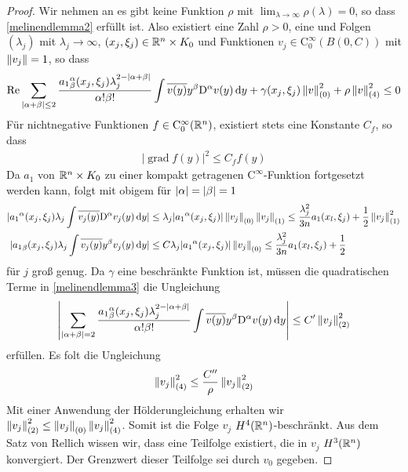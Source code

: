 \begin{proof}
Wir nehmen an es gibt keine Funktion $\rho$ mit $\lim_{\lambda\to\infty}\rho(\lambda)=0$, so dass \eqref{melinendlemma2} erfüllt ist. Also existiert eine Zahl $\rho>0$, eine und Folgen $(\lambda_j)$ mit $\lambda_j\to\infty$, $(x_j,\xi_j)\in\mathbb R^n\times K_0$ und Funktionen $v_j\in\mathrm C^\infty_0(B(0,C))$ mit $\left\lVert v_j\right\rVert =1$, so dass
\begin{align}\label{melinendlemma3}
\operatorname{Re} \sum_{|\alpha+\beta|\le 2} \frac{{a_1}^\alpha_\beta(x_j,\xi_j)\lambda_j^{2-|\alpha+\beta|}}{\alpha!\beta!}\int\overline{v(y)}y^\beta\mathrm D^\alpha v(y)\,\mathrm d y + \gamma(x_j,\xi_j)\left\lVert v\right\rVert_{(0)}^2 + \rho\left\lVert v\right\rVert _{(4)}^2 \le 0
\end{align}
Für nichtnegative Funktionen $f\in\mathrm C^\infty_0 (\mathbb R^n)$,  existiert stets eine Konstante $C_f$, so dass
\begin{align*}
|\operatorname{grad}f(y)|^2\le C_f f(y)
\end{align*}
Da $a_1$ von $\mathbb R^n\times K_0$ zu einer kompakt getragenen $\mathrm C^\infty$-Funktion fortgesetzt werden kann, folgt mit obigem für $\lvert\alpha\rvert=\lvert\beta\rvert=1$
\begin{align*}
|{a_1}^\alpha(x_j,\xi_j)\lambda_j\int \overline{v_j(y)}\mathrm D^\alpha v_j(y)\,\mathrm d y| &\le \lambda_j|{a_1}^\alpha(x_j,\xi_j)|\left\lVert v_j\right\rVert_{(0)}\left\lVert v_j\right\rVert_{(1)} \le \frac{\lambda_j^2}{3n}a_1(x_l,\xi_j) + \frac 1 2\left\lVert v_j\right\rVert_{(1)}^2\\
|{a_1}_\beta(x_j,\xi_j)\lambda_j\int \overline{v_j(y)}y^\beta v_j(y)\,\mathrm d y| &\le C \lambda_j|{a_1}^\alpha(x_j,\xi_j)|\left\lVert v_j\right\rVert_{(0)} \le \frac{\lambda_j^2}{3n}a_1(x_l,\xi_j) + \frac 1 2
\end{align*}
für $j$ groß genug. Da $\gamma$ eine beschränkte Funktion ist, müssen die quadratischen Terme in \eqref{melinendlemma3} die Ungleichung
\begin{align*}
\left\lvert\sum_{|\alpha+\beta|= 2} \frac{{a_1}^\alpha_\beta(x_j,\xi_j)\lambda_j^{2-|\alpha+\beta|}}{\alpha!\beta!}\int\overline{v(y)}y^\beta\mathrm D^\alpha v(y)\,\mathrm d y\right\rvert\le C'\left\lVert v_j\right\rVert_{(2)}^2
\end{align*}
erfüllen. Es folt die Ungleichung
\begin{align*}
\left\lVert v_j\right\rVert_{(4)}^2\le \frac{C''}{\rho}\left\lVert v_j\right\rVert_{(2)}^2
\end{align*}
Mit einer Anwendung der Hölderungleichung erhalten wir $\left\lVert v_j\right\rVert_{(2)}^2\le \left\lVert v_j\right\rVert_{(0)}\left\lVert v_j\right\rVert_{(4)}^2$. Somit ist die Folge $v_j$ $H^4(\mathbb R^n)$-beschränkt. Aus dem Satz von Rellich wissen wir, dass eine Teilfolge existiert, die in $v_j$ $H^3(\mathbb R^n)$ konvergiert. Der Grenzwert dieser Teilfolge sei durch $v_0$ gegeben.
\end{proof}
